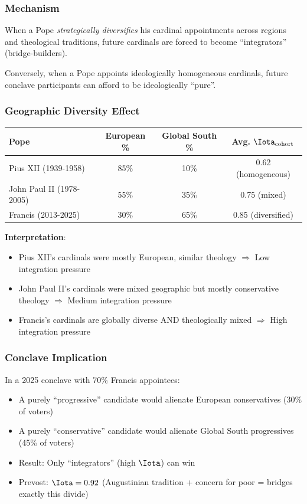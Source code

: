 \subsubsection{Mechanism}

When a Pope \textit{strategically diversifies} his cardinal appointments across regions and theological traditions, future cardinals are forced to become ``integrators'' (bridge-builders).

Conversely, when a Pope appoints ideologically homogeneous cardinals, future conclave participants can afford to be ideologically ``pure''.

\subsubsection{Geographic Diversity Effect}

\begin{table}[h]
\centering
\begin{tabular}{|l|c|c|c|}
\hline
\textbf{Pope} & \textbf{European \%} & \textbf{Global South \%} & \textbf{Avg. } $\Iota_{\text{cohort}}$ \\
\hline
Pius XII (1939-1958) & 85\% & 10\% & 0.62 (homogeneous) \\
John Paul II (1978-2005) & 55\% & 35\% & 0.75 (mixed) \\
Francis (2013-2025) & 30\% & 65\% & 0.85 (diversified) \\
\hline
\end{tabular}
\end{table}

\textbf{Interpretation}:
\begin{itemize}
\item Pius XII's cardinals were mostly European, similar theology $\Rightarrow$ Low integration pressure
\item John Paul II's cardinals were mixed geographic but mostly conservative theology $\Rightarrow$ Medium integration pressure
\item Francis's cardinals are globally diverse AND theologically mixed $\Rightarrow$ High integration pressure
\end{itemize}

\subsubsection{Conclave Implication}

In a 2025 conclave with 70\% Francis appointees:
\begin{itemize}
\item A purely ``progressive'' candidate would alienate European conservatives (30\% of voters)
\item A purely ``conservative'' candidate would alienate Global South progressives (45\% of voters)
\item Result: Only ``integrators'' (high $\Iota$) can win
\item Prevost: $\Iota = 0.92$ (Augustinian tradition + concern for poor = bridges exactly this divide)
\end{itemize}


